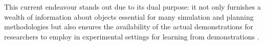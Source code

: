 \documentclass[../report.tex]{subfiles}
\begin{document}
    This current endeavour stands out due to its dual purpose: it not only furnishes a wealth of information about objects essential for many simulation and planning methodologies but also ensures the availability of the actual demonstrations for researchers to employ in experimental settings for learning from demonstrations \cite{mu2021maniskill}.
\end{document}
